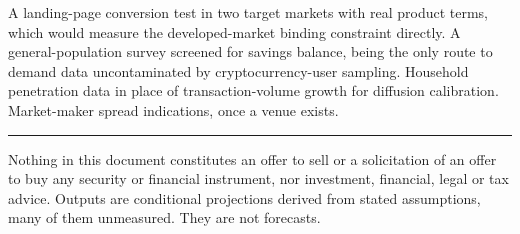 \documentclass[11pt,a4paper]{article}
\begin{document}
A landing-page conversion test in two target markets with real product
terms, which would measure the developed-market binding constraint directly.
A general-population survey screened for savings balance, being the only
route to demand data uncontaminated by cryptocurrency-user sampling.
Household penetration data in place of transaction-volume growth for
diffusion calibration. Market-maker spread indications, once a venue exists.

\vspace{1em}
\hrule
\vspace{0.6em}
{\footnotesize
Nothing in this document constitutes an offer to sell or a solicitation of
an offer to buy any security or financial instrument, nor investment,
financial, legal or tax advice. Outputs are conditional projections derived
from stated assumptions, many of them unmeasured. They are not forecasts.
\par}
\end{document}
